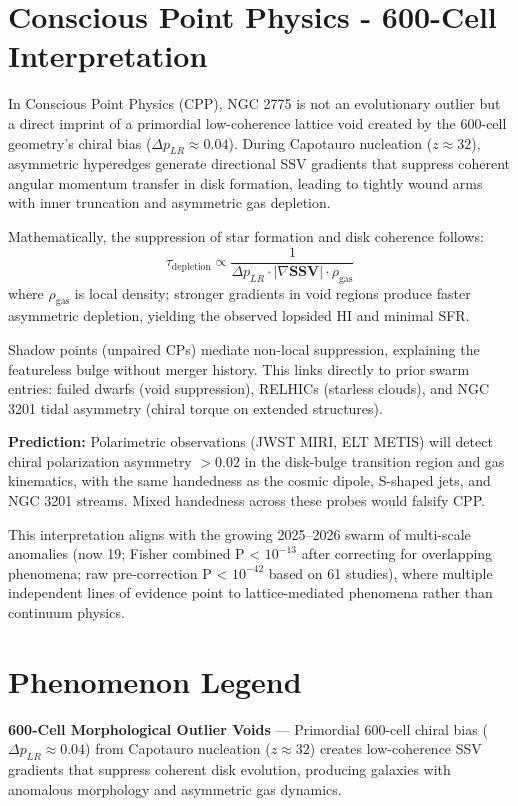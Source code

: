 \documentclass[11pt]{article}
\begin{document}
\section{Conscious Point Physics - 600-Cell Interpretation}
In Conscious Point Physics (CPP), NGC 2775 is not an evolutionary outlier but a direct imprint of a primordial low-coherence lattice void created by the 600-cell geometry's chiral bias ($\Delta p_{LR} \approx 0.04$). During Capotauro nucleation ($z \approx 32$), asymmetric hyperedges generate directional SSV gradients that suppress coherent angular momentum transfer in disk formation, leading to tightly wound arms with inner truncation and asymmetric gas depletion.

Mathematically, the suppression of star formation and disk coherence follows:
\[
\tau_{\text{depletion}} \propto \frac{1}{\Delta p_{LR} \cdot |\nabla \mathbf{SSV}| \cdot \rho_{\text{gas}}}
\]
where $\rho_{\text{gas}}$ is local density; stronger gradients in void regions produce faster asymmetric depletion, yielding the observed lopsided HI and minimal SFR.

Shadow points (unpaired CPs) mediate non-local suppression, explaining the featureless bulge without merger history. This links directly to prior swarm entries: failed dwarfs (void suppression), RELHICs (starless clouds), and NGC 3201 tidal asymmetry (chiral torque on extended structures).

\textbf{Prediction:} Polarimetric observations (JWST MIRI, ELT METIS) will detect chiral polarization asymmetry $>0.02$ in the disk-bulge transition region and gas kinematics, with the same handedness as the cosmic dipole, S-shaped jets, and NGC 3201 streams. Mixed handedness across these probes would falsify CPP.

This interpretation aligns with the growing 2025--2026 swarm of multi-scale anomalies (now 19; Fisher combined P < $10^{-13}$ after correcting for overlapping phenomena; raw pre-correction P < $10^{-42}$ based on 61 studies), where multiple independent lines of evidence point to lattice-mediated phenomena rather than continuum physics.

\section{Phenomenon Legend}
\textbf{600-Cell Morphological Outlier Voids} — Primordial 600-cell chiral bias ($\Delta p_{LR} \approx 0.04$) from Capotauro nucleation ($z \approx 32$) creates low-coherence SSV gradients that suppress coherent disk evolution, producing galaxies with anomalous morphology and asymmetric gas dynamics.
\end{document}
